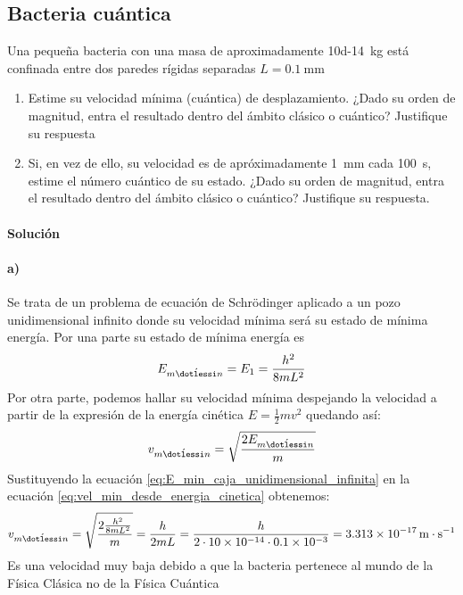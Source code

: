 \documentclass[12pt, a4paper]{article}
\begin{document}
        \subsection{Bacteria cuántica} Una pequeña bacteria con una masa de aproximadamente \SI{10d-14}{\kilo\gram}
                está confinada entre dos paredes rígidas separadas $L=\SI{0.1}{\milli\metre}$
        \begin{enumerate}[label=\alph*)]
        \item Estime su velocidad mínima (cuántica) de desplazamiento. ¿Dado su orden de magnitud,
            entra el resultado dentro del ámbito clásico o cuántico? Justifique su respuesta
        \item Si, en vez de ello, su velocidad es de apróximadamente \SI{1}{\milli\metre} cada
            \SI{100}{\second}, estime el número cuántico de su estado. ¿Dado su orden de magnitud,
            entra el resultado dentro del ámbito clásico o cuántico? Justifique su respuesta.
        \end{enumerate}


        \paragraph{\textbf{Solución}}
        \paragraph {a)} Se trata de un problema de ecuación de Schrödinger aplicado a un pozo unidimensional infinito
        donde su velocidad mínima será su estado de mínima energía. Por una parte su estado de mínima energía
        es
        \begin{equation}    \label{eq:E_min_caja_unidimensional_infinita}
            E_{m\acute{\dotlessi}n} = E_1 =\frac{h^2}{8mL^2}
        \end{equation}
        Por otra parte, podemos hallar su velocidad mínima despejando la
        velocidad a partir de la expresión de la energía cinética $E=\frac{1}{2}mv^2$ quedando así:
        \begin{equation}    \label{eq:vel_min_desde_energia_cinetica}
            v_{m\acute{\dotlessi}n}=\sqrt{\frac{2E_{m\acute{\dotlessi}n}}{m}}
        \end{equation}
        Sustituyendo la ecuación \ref{eq:E_min_caja_unidimensional_infinita} en la ecuación \ref{eq:vel_min_desde_energia_cinetica}
        obtenemos:
        $$
            v_{m\acute{\dotlessi}n}=\sqrt{\frac{2\frac{h^2}{8mL^2}}{m}} = \frac{h}{2mL} =
            \frac{h}{\num{2} \cdot \num{10d-14} \cdot \num{0.1d-3}} = \SI{3.313d-17}{\metre\cdot\second^{-1}}
        $$
        Es una velocidad muy baja debido a que la bacteria pertenece al mundo de la Física Clásica
        no de la Física Cuántica
\end{document}
